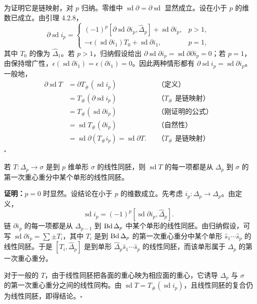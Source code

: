 为证明它是链映射，对 $p$ 归纳。零维中 $\operatorname{sd}\partial=\partial\operatorname{sd}$ 显然成立。设在小于 $p$ 的维数已成立。由引理 4.2.8，
\[
\partial\operatorname{sd}i_p=
\begin{cases}
(-1)^p[\partial\operatorname{sd}\partial i_p,\widehat\Delta_p]+\operatorname{sd}\partial i_p,&p>1,\\
-\epsilon(\operatorname{sd}\partial i_1)T_0+\operatorname{sd}\partial i_1,&p=1,
\end{cases}
\]
其中 $T_0$ 的像为 $\widehat\Delta_1$。若 $p>1$，归纳假设给出 $\partial\operatorname{sd}\partial i_p=\operatorname{sd}\partial\partial i_p=0$；若 $p=1$，由保持增广性，$\epsilon(\operatorname{sd}\partial i_1)=\epsilon(\partial i_1)=0$。因此两种情形都有 $\partial\operatorname{sd}i_p=\operatorname{sd}\partial i_p$。一般地，
\begin{align*}
\partial\operatorname{sd}T
&=\partial T_\#(\operatorname{sd}i_p) &&\text{（定义）}\\
&=T_\#(\partial\operatorname{sd}i_p)&&\text{（$T_\#$ 是链映射）}\\
&=T_\#(\operatorname{sd}\partial i_p)&&\text{（刚证明的公式）}\\
&=\operatorname{sd}T_\#(\partial i_p)&&\text{（自然性）}\\
&=\operatorname{sd}\partial(T_\#i_p)=\operatorname{sd}\partial T. &&\text{（$T_\#$ 是链映射）}
\end{align*}
\hfill$\square$

若 $T:\Delta_p\to\sigma$ 是到 $p$ 维单形 $\sigma$ 的线性同胚，则 $\operatorname{sd}T$ 的每一项都是从 $\Delta_p$ 到 $\sigma$ 的第一次重心重分中某个单形的线性同胚。

\textbf{证明：}$p=0$ 时显然。设结论在小于 $p$ 的维数成立。先考虑 $i_p:\Delta_p\to\Delta_p$。由定义，
\[
\operatorname{sd}i_p=(-1)^p[\operatorname{sd}\partial i_p,\widehat\Delta_p].
\]
链 $\partial i_p$ 的每一项都是从 $\Delta_{p-1}$ 到 $\operatorname{Bd}\Delta_p$ 中某个单形的线性同胚。由归纳假设，可写 $\operatorname{sd}\partial i_p=\sum\pm T_i$，其中 $T_i$ 是到 $\operatorname{Bd}\Delta_p$ 的第一次重心重分中某个单形 $\widehat s_1\cdots\widehat s_p$ 的线性同胚。于是 $[T_i,\widehat\Delta_p]$ 是到单形 $\widehat\Delta_p\widehat s_1\cdots\widehat s_p$ 的线性同胚，而该单形属于 $\Delta_p$ 的第一次重心重分。

对于一般的 $T$，由于线性同胚把各面的重心映为相应面的重心，它诱导 $\Delta_p$ 与 $\sigma$ 的第一次重心重分之间的线性同构。由 $\operatorname{sd}T=T_\#(\operatorname{sd}i_p)$，且线性同胚的复合仍为线性同胚，即得结论。\hfill$\square$

